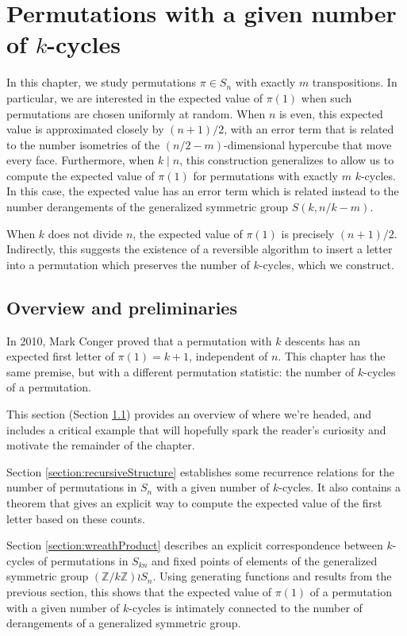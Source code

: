 \chapter{Permutations with a given number of \texorpdfstring{$k$}{k}-cycles}
\label{cha:PermutationStatistics}

In this chapter, we study permutations $\pi \in S_n$ with exactly $m$ transpositions.
In particular, we are interested in the expected value of $\pi(1)$ when such
permutations are chosen uniformly at random. When $n$ is even, this expected value
is approximated closely by $(n+1)/2$, with an error term that is related to the number isometries
of the $(n/2-m)$-dimensional hypercube that move every face.
Furthermore, when $k \mid n$, this construction generalizes to allow us to compute
the expected value of $\pi(1)$ for permutations
with exactly $m$ $k$-cycles. In this case, the expected value has an
error term which is related instead to the number derangements of the
generalized symmetric group $S(k,n/k-m)$.

When $k$ does not divide $n$, the expected value of $\pi(1)$ is precisely
$(n+1)/2$.
Indirectly, this suggests the existence of a reversible algorithm
to insert a letter into a permutation which preserves the number of $k$-cycles,
which we construct.

\section{Overview and preliminaries}
\label{section:background}

In 2010, Mark Conger \cite{conger} proved that a permutation
with $k$ descents has an expected first letter of $\pi(1) = k + 1$,
independent of $n$.
This chapter has the same premise, but with a different permutation statistic:
the number of $k$-cycles of a permutation.

This section (Section \ref{section:background}) provides an overview of where
we're headed, and includes a critical example that will hopefully spark the
reader's curiosity and motivate the remainder of the chapter.

Section \ref{section:recursiveStructure} establishes some recurrence relations for
the number of permutations in $S_n$ with a given number of $k$-cycles.
It also contains a theorem that gives an explicit way to compute the expected
value of the first letter based on these counts.

Section \ref{section:wreathProduct} describes an explicit correspondence
between $k$-cycles of permutations in $S_{kn}$ and fixed points of elements of the generalized
symmetric group $(\mathbb{Z}/k\mathbb{Z}) \wr S_n$. Using generating functions and results
from the previous section, this shows that the expected value of $\pi(1)$ of a
permutation with a given number of $k$-cycles is intimately connected to the
number of derangements of a generalized symmetric group.

